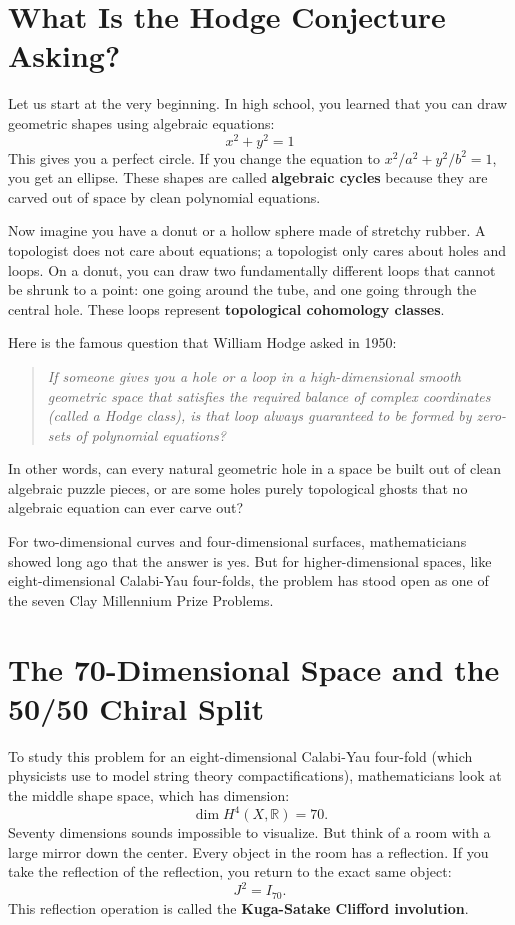 \documentclass[11pt,a4paper]{article}
\theoremstyle{definition}
\begin{document}
\section{What Is the Hodge Conjecture Asking?}

Let us start at the very beginning. In high school, you learned that you can draw geometric shapes using algebraic equations:
\begin{equation}
x^2 + y^2 = 1
\end{equation}
This gives you a perfect circle. If you change the equation to $x^2 / a^2 + y^2 / b^2 = 1$, you get an ellipse. These shapes are called \textbf{algebraic cycles} because they are carved out of space by clean polynomial equations.

Now imagine you have a donut or a hollow sphere made of stretchy rubber. A topologist does not care about equations; a topologist only cares about holes and loops. On a donut, you can draw two fundamentally different loops that cannot be shrunk to a point: one going around the tube, and one going through the central hole. These loops represent \textbf{topological cohomology classes}.

Here is the famous question that William Hodge asked in 1950:
\begin{quote}
\textit{If someone gives you a hole or a loop in a high-dimensional smooth geometric space that satisfies the required balance of complex coordinates (called a Hodge class), is that loop always guaranteed to be formed by zero-sets of polynomial equations?}
\end{quote}
In other words, can every natural geometric hole in a space be built out of clean algebraic puzzle pieces, or are some holes purely topological ghosts that no algebraic equation can ever carve out?

For two-dimensional curves and four-dimensional surfaces, mathematicians showed long ago that the answer is yes. But for higher-dimensional spaces, like eight-dimensional Calabi-Yau four-folds, the problem has stood open as one of the seven Clay Millennium Prize Problems.

\section{The 70-Dimensional Space and the 50/50 Chiral Split}

To study this problem for an eight-dimensional Calabi-Yau four-fold (which physicists use to model string theory compactifications), mathematicians look at the middle shape space, which has dimension:
\begin{equation}
\dim H^4(X, \mathbb{R}) = 70.
\end{equation}
Seventy dimensions sounds impossible to visualize. But think of a room with a large mirror down the center. Every object in the room has a reflection. If you take the reflection of the reflection, you return to the exact same object:
\begin{equation}
J^2 = I_{70}.
\end{equation}
This reflection operation is called the \textbf{Kuga-Satake Clifford involution}.
\end{document}
